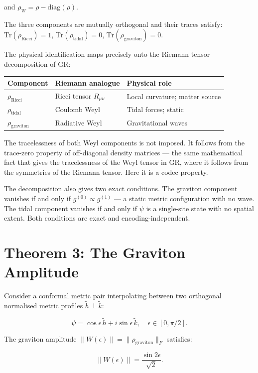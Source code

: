 and $\rho_W = \rho - \mathrm{diag}(\rho)$.

The three components are mutually orthogonal and their traces satisfy:
$\mathrm{Tr}(\rho_{\mathrm{Ricci}}) = 1$,
$\mathrm{Tr}(\rho_{\mathrm{tidal}}) = 0$,
$\mathrm{Tr}(\rho_{\mathrm{graviton}}) = 0$.

The physical identification maps precisely onto the Riemann tensor
decomposition of GR:

\begin{center}
\begin{tabular}{lll}
\toprule
Component & Riemann analogue & Physical role \\
\midrule
$\rho_{\mathrm{Ricci}}$ & Ricci tensor $R_{\mu\nu}$ &
Local curvature; matter source \\
$\rho_{\mathrm{tidal}}$ & Coulomb Weyl & Tidal forces; static \\
$\rho_{\mathrm{graviton}}$ & Radiative Weyl & Gravitational waves \\
\bottomrule
\end{tabular}
\end{center}

The tracelessness of both Weyl components is not imposed. It follows
from the trace-zero property of off-diagonal density matrices ---
the same mathematical fact that gives the tracelessness of the Weyl
tensor in GR, where it follows from the symmetries of the Riemann
tensor. Here it is a codec property.

The decomposition also gives two exact conditions. The graviton
component vanishes if and only if $g^{(0)} \propto g^{(1)}$ --- a
static metric configuration with no wave. The tidal component vanishes
if and only if $\psi$ is a single-site state with no spatial extent.
Both conditions are exact and encoding-independent.

\section{Theorem 3: The Graviton Amplitude}

Consider a conformal metric pair interpolating between two orthogonal
normalised metric profiles $\tilde{h} \perp \tilde{k}$:

\[
\psi = \cos\epsilon\,\tilde{h} + i\sin\epsilon\,\tilde{k},
\quad \epsilon \in [0, \pi/2].
\]

The graviton amplitude $\|W(\epsilon)\| = \|\rho_{\mathrm{graviton}}\|_F$
satisfies:

\[
\boxed{\|W(\epsilon)\| = \frac{\sin 2\epsilon}{\sqrt{2}}.}
\]


